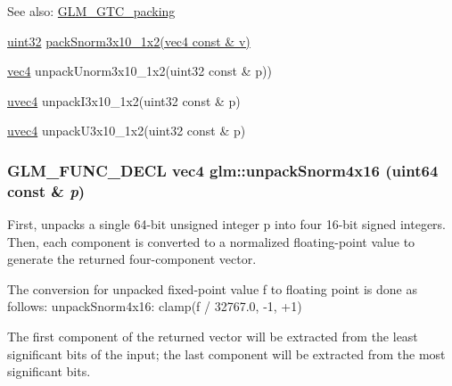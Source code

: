 \begin{Desc}
\item[See also:]\hyperlink{group__gtc__packing}{GLM\_\-GTC\_\-packing} 

\hyperlink{group__gtc__type__precision_g202b6a53c105fcb7e531f9b443518451}{uint32} \hyperlink{group__gtc__packing_g0d4157cec37c0312216a7be1cc92df54}{packSnorm3x10\_\-1x2(vec4 const \& v)} 

\hyperlink{group__core__types_g5881b1b022d7fd1b7218f5916532dd02}{vec4} unpackUnorm3x10\_\-1x2(uint32 const \& p)) 

\hyperlink{group__core__types_g1c426d19627b32b14f0089f7f4ba7b1d}{uvec4} unpackI3x10\_\-1x2(uint32 const \& p) 

\hyperlink{group__core__types_g1c426d19627b32b14f0089f7f4ba7b1d}{uvec4} unpackU3x10\_\-1x2(uint32 const \& p) \end{Desc}
\hypertarget{group__gtc__packing_gdb01fc0530f07beb509c89d97b6f4d20}{
\subsubsection[unpackSnorm4x16]{\setlength{\rightskip}{0pt plus 5cm}GLM\_\-FUNC\_\-DECL vec4 glm::unpackSnorm4x16 (uint64 const \& {\em p})}}
\label{group__gtc__packing_gdb01fc0530f07beb509c89d97b6f4d20}


First, unpacks a single 64-bit unsigned integer p into four 16-bit signed integers. Then, each component is converted to a normalized floating-point value to generate the returned four-component vector.

The conversion for unpacked fixed-point value f to floating point is done as follows: unpackSnorm4x16: clamp(f / 32767.0, -1, +1)

The first component of the returned vector will be extracted from the least significant bits of the input; the last component will be extracted from the most significant bits.

